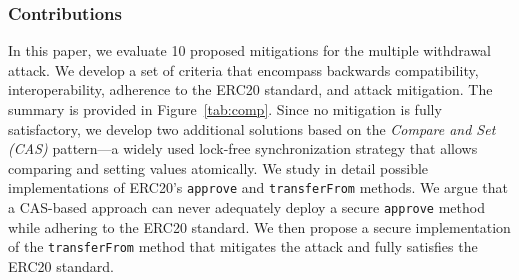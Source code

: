 \subsubsection*{Contributions} In this paper, we evaluate 10 proposed mitigations for the multiple withdrawal attack. We develop a set of criteria that encompass backwards compatibility, interoperability, adherence to the ERC20 standard, and attack mitigation. The summary is provided in Figure~\ref{tab:comp}. Since no mitigation is fully satisfactory, we develop two additional solutions based on the \textit{Compare and Set (CAS)} pattern\cite{Ref06}---a widely used lock-free synchronization strategy that allows comparing and setting values atomically. We study in detail possible implementations of ERC20's \texttt{approve} and \texttt{transferFrom} methods. We argue that a CAS-based approach can never adequately deploy a secure \texttt{approve} method while adhering to the ERC20 standard. We then propose a secure implementation of the \texttt{transferFrom} method that mitigates the attack and fully satisfies the ERC20 standard. 


